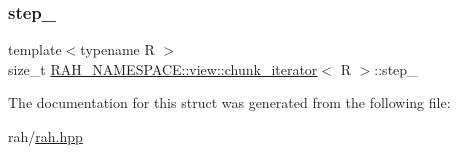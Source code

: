 \mbox{\label{struct_r_a_h___n_a_m_e_s_p_a_c_e_1_1view_1_1chunk__iterator_ad683d795a58877247cac565ba245598c}} 
\subsubsection{\texorpdfstring{step\_}{step\_}}
{\footnotesize\ttfamily template$<$typename R $>$ \\
size\+\_\+t \mbox{\hyperlink{struct_r_a_h___n_a_m_e_s_p_a_c_e_1_1view_1_1chunk__iterator}{R\+A\+H\+\_\+\+N\+A\+M\+E\+S\+P\+A\+C\+E\+::view\+::chunk\+\_\+iterator}}$<$ R $>$\+::step\+\_\+}



The documentation for this struct was generated from the following file\+:\begin{DoxyCompactItemize}
\item 
rah/\mbox{\hyperlink{rah_8hpp}{rah.\+hpp}}\end{DoxyCompactItemize}
